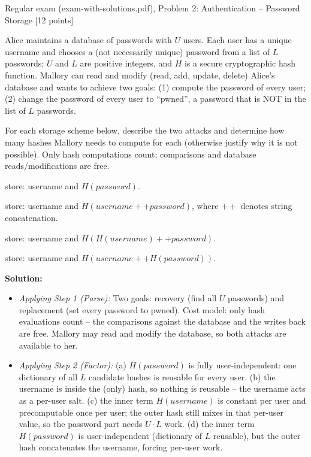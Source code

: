 \documentclass[12pt, a4paper]{article}
\begin{document}
\begin{practicebox}{Regular exam (exam-with-solutions.pdf), Problem 2: Authentication -- Password Storage [12 points]}
\begin{problembox}
Alice maintains a database of passwords with $U$ users. Each user has a unique username and chooses a (not necessarily unique) password from a list of $L$ passwords; $U$ and $L$ are positive integers, and $H$ is a secure cryptographic hash function. Mallory can read and modify (read, add, update, delete) Alice's database and wants to achieve two goals: (1) compute the password of every user; (2) change the password of every user to ``pwned'', a password that is NOT in the list of $L$ passwords.

For each storage scheme below, describe the two attacks and determine how many hashes Mallory needs to compute for each (otherwise justify why it is not possible). Only hash computations count; comparisons and database reads/modifications are free.
\begin{tightitem}
\item[(a)] [3p] store: username and $H(password)$.
\item[(b)] [3p] store: username and $H(username ++ password)$, where $++$ denotes string concatenation.
\item[(c)] [3p] store: username and $H(H(username) ++ password)$.
\item[(d)] [3p] store: username and $H(username ++ H(password))$.
\end{tightitem}
\end{problembox}

\textbf{Solution:}
\begin{itemize}
    \item \textit{Applying Step 1 (Parse):} Two goals: recovery (find all $U$ passwords) and replacement (set every password to pwned). Cost model: only hash evaluations count -- the comparisons against the database and the writes back are free. Mallory may read and modify the database, so both attacks are available to her.
    \item \textit{Applying Step 2 (Factor):} (a) $H(password)$ is fully user-independent: one dictionary of all $L$ candidate hashes is reusable for every user. (b) the username is inside the (only) hash, so nothing is reusable -- the username acts as a per-user salt. (c) the inner term $H(username)$ is constant per user and precomputable once per user;
    the outer hash still mixes in that per-user value, so the password part needs $U \cdot L$ work. (d) the inner term $H(password)$ is user-independent (dictionary of $L$ reusable), but the outer hash concatenates the username, forcing per-user work.


\end{itemize}
\end{practicebox}
\end{document}
